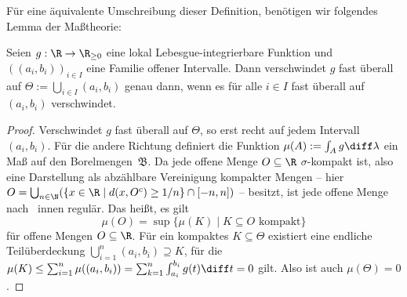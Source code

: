 Für eine äquivalente Umschreibung dieser Definition, benötigen wir folgendes Lemma der Maßtheorie:

\begin{lemma}\label{lemma-vanishes-intervals}
	Seien $g: \R \to \R_{\geq 0}$ eine lokal Lebesgue-integrierbare Funktion und $((a_i, b_i))_{i\in I}$ eine Familie offener Intervalle.
	Dann verschwindet $g$ fast überall auf $\Theta:=\bigcup_{i\in I} (a_i, b_i)$ genau dann, wenn es für alle $i\in I$ fast überall auf $(a_i, b_i)$ verschwindet.
\end{lemma}
\begin{proof}
	Verschwindet $g$ fast überall auf $\Theta$, so erst recht auf jedem Intervall $(a_i, b_i)$.
	Für die andere Richtung definiert die Funktion $\mu(A):= \int_A g \diff \lambda$ ein Maß auf den Borelmengen~$\mathfrak{B}$.
	Da jede offene Menge $O\subseteq\R$ $\sigma$-kompakt ist, also eine Darstellung als abzählbare Vereinigung kompakter Mengen -- hier $O=\bigcup_{n\in\N}(\{ x \in\R \mid d(x, O^c) \geq 1/n \} \cap [-n, n] )$ -- besitzt, ist jede offene Menge nach~\cite[1.2 Folgerungen (e)]{Elstrodt2011Top} innen regulär.
	Das heißt, es gilt
	\[ \mu(O)=\sup\{ \mu(K) \mid K\subseteq O \text{ kompakt} \} \]
	für offene Mengen $O\subseteq\R$.
	Für ein kompaktes $K\subseteq \Theta$ existiert eine endliche Teil\-über\-deckung $\bigcup_{i=1}^n (a_i, b_i) \supseteq K$, für die $\mu(K) \leq \sum_{i=1}^{n} \mu((a_i, b_i)) = \sum_{k=1}^{n} \int_{a_i}^{b_i} g(t) \diff t = 0$ gilt.
	Also ist auch $\mu(\Theta)=0$.
\end{proof}

